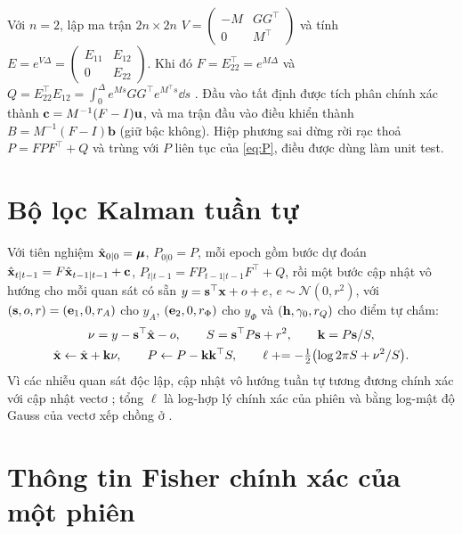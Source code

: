 Với $n=2$, lập ma trận $2n\times2n$ $V=\begin{pmatrix}-M & GG^\top\\ 0 & M^\top\end{pmatrix}$ và tính $E=e^{V\Delta}=\begin{pmatrix}E_{11}&E_{12}\\0&E_{22}\end{pmatrix}$. Khi đó $F=E_{22}^\top=e^{M\Delta}$ và $Q=E_{22}^\top E_{12}=\int_0^\Delta e^{Ms}GG^\top e^{M^\top s}\dd s$ \citep{VanLoan1978}. Đầu vào tất định được tích phân chính xác thành $\mathbf c=M^{-1}(F-I)\mathbf{u}$, và ma trận đầu vào điều khiển thành $B=M^{-1}(F-I)\mathbf b$ (giữ bậc không). Hiệp phương sai dừng rời rạc thoả $P=FPF^\top+Q$ và trùng với $P$ liên tục của \eqref{eq:P}, điều được dùng làm unit test.

\section{Bộ lọc Kalman tuần tự}
\label{app:kalman}

Với tiên nghiệm $\hat{\mathbf{x}}_{0|0}=\boldsymbol{\mu}$, $P_{0|0}=P$, mỗi epoch gồm bước dự đoán $\hat{\mathbf{x}}_{t|t-1}=F\hat{\mathbf{x}}_{t-1|t-1}+\mathbf c$, $P_{t|t-1}=FP_{t-1|t-1}F^\top+Q$, rồi một bước cập nhật vô hướng cho mỗi quan sát có sẵn $y=\mathbf s^\top\mathbf{x}+o+e$, $e\sim\mathcal N(0,r^2)$, với $(\mathbf s,o,r)=(\mathbf e_1,0,r_{A})$ cho $y_A$, $(\mathbf e_2,0,r_{\Phi})$ cho $y_\Phi$ và $(\mathbf{h},\gamma_0,r_{Q})$ cho điểm tự chấm:
\begin{gather*}
\nu=y-\mathbf s^\top\hat{\mathbf{x}}-o,\qquad S=\mathbf s^\top P\mathbf s+r^2,\qquad \mathbf k=P\mathbf s/S,\\
\hat{\mathbf{x}}\leftarrow\hat{\mathbf{x}}+\mathbf k\nu,\qquad P\leftarrow P-\mathbf k\mathbf k^\top S,\qquad
\ell\mathrel{+}=-\tfrac12\bigl(\log2\pi S+\nu^2/S\bigr).
\end{gather*}
Vì các nhiễu quan sát độc lập, cập nhật vô hướng tuần tự tương đương chính xác với cập nhật vectơ \citep{Durbin2012}; tổng $\ell$ là log-hợp lý chính xác của phiên và bằng log-mật độ Gauss của vectơ xếp chồng ở .

\section{Thông tin Fisher chính xác của một phiên}
\label{app:fisher}

